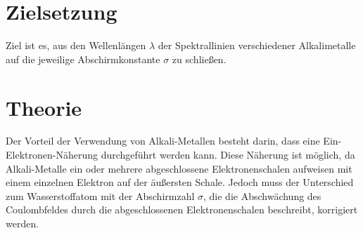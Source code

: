 \section{Zielsetzung}
Ziel ist es, aus den Wellenlängen $\lambda$ der Spektrallinien verschiedener Alkalimetalle auf die jeweilige Abschirmkonstante $\sigma$ zu schließen.


\section{Theorie}
\label{sec:Theorie}

Der Vorteil der Verwendung von Alkali-Metallen besteht darin, dass eine Ein-Elektronen-Näherung durchgeführt werden kann. Diese Näherung ist möglich, da Alkali-Metalle ein oder mehrere abgeschlossene Elektronenschalen aufweisen mit einem einzelnen Elektron auf der äußersten Schale. Jedoch muss der Unterschied zum Wasserstoffatom mit der Abschirmzahl $\sigma$, die die Abschwächung des Coulombfeldes durch die abgeschlossenen Elektronenschalen beschreibt, korrigiert werden.
